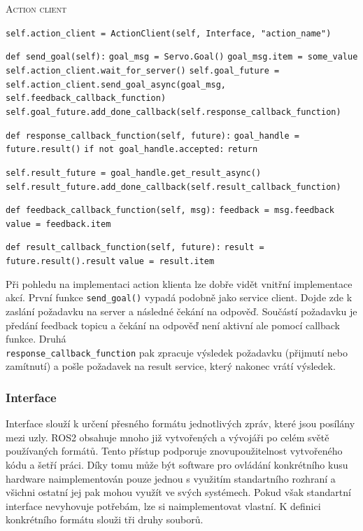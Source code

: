 \begin{algorithm}[h!]
	\label{}
	\caption{\textsc{Action client}}
	
	\DontPrintSemicolon
	\SetAlgoNoLine
	\SetNlSty{}{}{:}
	\SetNlSkip{-1.1em}
	
	\BlankLine \Indp\Indpp
	
 	\texttt{self.action\_client = ActionClient(self, Interface, "action\_name")}\;
 	
 	\BlankLine
 	\texttt{def send\_goal(self):}\;
 	\Indp\Indp
 	\texttt{goal\_msg = Servo.Goal()}\;
 	\texttt{goal\_msg.item = some\_value}\;
 	\texttt{self.action\_client.wait\_for\_server()}\;
 	\texttt{self.goal\_future = self.action\_client.send\_goal\_async(goal\_msg, self.feedback\_callback\_function)}\;
 	\texttt{self.goal\_future.add\_done\_callback(self.response\_callback\_function)}\;
	\Indm\Indm

	\BlankLine
	\tcp{reakce na přijmutí nebo zamítnutí požadavku}
 	\texttt{def response\_callback\_function(self, future):}\;
 	\Indp\Indp
 	\texttt{goal\_handle = future.result()}\;
 	\texttt{if not goal\_handle.accepted:}\;
 	\Indp\Indp
 	\texttt{return}\;
	\Indm\Indm
	
	\BlankLine
 	\texttt{self.result\_future = goal\_handle.get\_result\_async()}\;
 	\texttt{self.result\_future.add\_done\_callback(self.result\_callback\_function)}\;
	\Indm\Indm

 	\BlankLine
 	\texttt{def feedback\_callback\_function(self, msg):}\;
 	\Indp\Indp
 	\texttt{feedback = msg.feedback}\;
 	\texttt{value = feedback.item}\;
	\Indm\Indm

	\BlankLine
 	\texttt{def result\_callback\_function(self, future):}\;
 	\Indp\Indp
    \texttt{result = future.result().result}\;
    \texttt{value = result.item}\;
    
\end{algorithm}
Při pohledu na implementaci action klienta lze dobře vidět vnitřní implementace akcí. První funkce \verb|send_goal()| vypadá podobně jako service client. Dojde zde k zaslání požadavku na server a následné čekání na odpověď. Součástí požadavku je předání feedback topicu a čekání na odpověď není aktivní ale pomocí callback funkce. Druhá \\ \verb|response_callback_function| pak zpracuje výsledek požadavku (přijmutí nebo zamítnutí) a pošle požadavek na result service, který nakonec vrátí výsledek.

\subsubsection*{Interface}
Interface slouží k určení přesného formátu jednotlivých zpráv, které jsou posílány mezi uzly. ROS2 obsahuje mnoho již vytvořených a vývojáři po celém světě používaných formátů. Tento přístup podporuje znovupoužitelnost vytvořeného kódu a šetří práci. Díky tomu může být software pro ovládání konkrétního kusu hardware naimplementován pouze jednou s využitím standartního rozhraní a všichni ostatní jej pak mohou využít ve svých systémech.
Pokud však standartní interface nevyhovuje potřebám, lze si naimplementovat vlastní. K definici konkrétního formátu slouži tři druhy souborů. 

